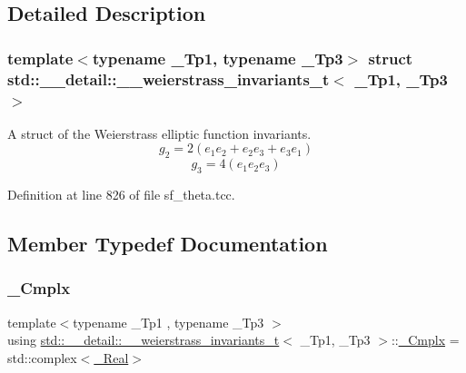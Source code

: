 \subsection{Detailed Description}
\subsubsection*{template$<$typename \+\_\+\+Tp1, typename \+\_\+\+Tp3$>$\newline
struct std\+::\+\_\+\+\_\+detail\+::\+\_\+\+\_\+weierstrass\+\_\+invariants\+\_\+t$<$ \+\_\+\+Tp1, \+\_\+\+Tp3 $>$}

A struct of the Weierstrass elliptic function invariants. \[ g_2 = 2(e_1 e_2 + e_2 e_3 + e_3 e_1) \] \[ g_3 = 4(e_1 e_2 e_3) \] 

Definition at line 826 of file sf\+\_\+theta.\+tcc.



\subsection{Member Typedef Documentation}
\mbox{\label{structstd_1_1____detail_1_1____weierstrass__invariants__t_a611ce9f1f3676ff9615d4205b6115528}} 
\subsubsection{\texorpdfstring{\+\_\+\+Cmplx}{\_Cmplx}}
{\footnotesize\ttfamily template$<$typename \+\_\+\+Tp1 , typename \+\_\+\+Tp3 $>$ \\
using \hyperlink{structstd_1_1____detail_1_1____weierstrass__invariants__t}{std\+::\+\_\+\+\_\+detail\+::\+\_\+\+\_\+weierstrass\+\_\+invariants\+\_\+t}$<$ \+\_\+\+Tp1, \+\_\+\+Tp3 $>$\+::\hyperlink{structstd_1_1____detail_1_1____weierstrass__invariants__t_a611ce9f1f3676ff9615d4205b6115528}{\+\_\+\+Cmplx} =  std\+::complex$<$\hyperlink{structstd_1_1____detail_1_1____weierstrass__invariants__t_a7990bba8f3b3d155a80d051c86de1460}{\+\_\+\+Real}$>$}



